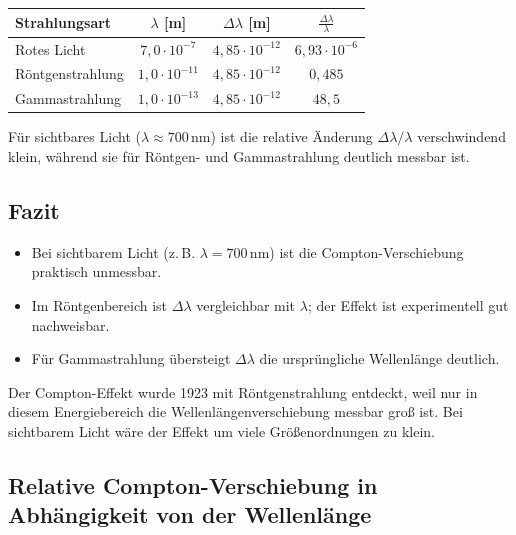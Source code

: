\begin{center}
	\begin{tabular}{|l|c|c|c|}
		\hline
		\textbf{Strahlungsart} & \(\lambda\) [m] & \(\Delta \lambda\) [m] & \(\frac{\Delta \lambda}{\lambda}\) \\
		\hline
		Rotes Licht & \(7{,}0 \cdot 10^{-7}\) & \(4{,}85 \cdot 10^{-12}\) & \(6{,}93 \cdot 10^{-6}\) \\
		Röntgenstrahlung & \(1{,}0 \cdot 10^{-11}\) & \(4{,}85 \cdot 10^{-12}\) & \(0{,}485\) \\
		Gammastrahlung & \(1{,}0 \cdot 10^{-13}\) & \(4{,}85 \cdot 10^{-12}\) & \(48{,}5\) \\
		\hline
	\end{tabular}
\end{center}

\begin{HinweisBox}
	Für sichtbares Licht (\(\lambda \approx 700\,\text{nm}\)) ist die relative Änderung \(\Delta \lambda / \lambda \) 
	verschwindend klein, während sie für Röntgen- und Gammastrahlung deutlich messbar ist.
\end{HinweisBox}



\subsection*{Fazit}

\begin{itemize}
	\item Bei sichtbarem Licht (z.\,B. \( \lambda = 700\,\text{nm} \)) ist die Compton-Verschiebung praktisch unmessbar.
	\item Im Röntgenbereich ist \(\Delta \lambda\) vergleichbar mit \(\lambda\); der Effekt ist experimentell gut nachweisbar.
	\item Für Gammastrahlung übersteigt \(\Delta \lambda\) die ursprüngliche Wellenlänge deutlich.
\end{itemize}

\begin{PhysikBox}
	Der Compton-Effekt wurde 1923 mit Röntgenstrahlung entdeckt, 
	weil nur in diesem Energiebereich die Wellenlängenverschiebung messbar groß ist.  
	Bei sichtbarem Licht wäre der Effekt um viele Größenordnungen zu klein.
\end{PhysikBox}

\newpage
\noindent

\subsection*{Relative Compton-Verschiebung in Abhängigkeit von der Wellenlänge}

